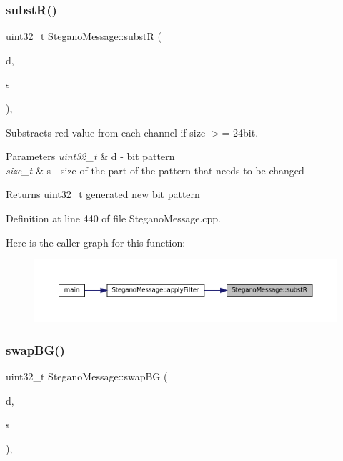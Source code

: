 \subsubsection{\texorpdfstring{substR()}{substR()}}
{\footnotesize\ttfamily uint32\+\_\+t Stegano\+Message\+::substR (\begin{DoxyParamCaption}\item[{uint32\+\_\+t}]{d,  }\item[{size\+\_\+t}]{s }\end{DoxyParamCaption})\hspace{0.3cm}{\ttfamily [static]}, {\ttfamily [private]}}



Substracts red value from each channel if size $>$= 24bit. 


\begin{DoxyParams}{Parameters}
{\em uint32\+\_\+t} & d -\/ bit pattern \\
\hline
{\em size\+\_\+t} & s -\/ size of the part of the pattern that needs to be changed \\
\hline
\end{DoxyParams}
\begin{DoxyReturn}{Returns}
uint32\+\_\+t generated new bit pattern 
\end{DoxyReturn}


Definition at line 440 of file Stegano\+Message.\+cpp.

Here is the caller graph for this function\+:\nopagebreak
\begin{figure}[H]
\begin{center}
\leavevmode
\includegraphics[width=350pt]{classSteganoMessage_a021f0126410e739bc89ac2458198ad0c_icgraph}
\end{center}
\end{figure}
\mbox{\label{classSteganoMessage_a06f64f5198cf180771dfe692125936be}} 
\subsubsection{\texorpdfstring{swapBG()}{swapBG()}}
{\footnotesize\ttfamily uint32\+\_\+t Stegano\+Message\+::swap\+BG (\begin{DoxyParamCaption}\item[{uint32\+\_\+t}]{d,  }\item[{size\+\_\+t}]{s }\end{DoxyParamCaption})\hspace{0.3cm}{\ttfamily [static]}, {\ttfamily [private]}}



